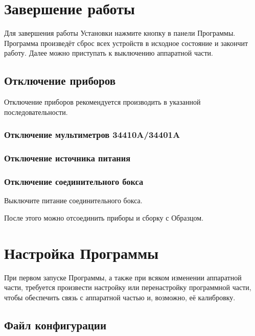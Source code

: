 \documentclass[12pt, a4paper, twocolumn]{report}
\begin{document}
\chapter{Завершение работы}

Для завершения работы Установки нажмите кнопку  в панели Программы. Программа произведёт сброс всех устройств в исходное состояние и закончит работу. Далее можно приступать к выключению аппаратной части.

\section{Отключение приборов}

Отключение приборов рекомендуется производить в указанной последовательности.

\subsection{Отключение мультиметров 34410A/34401A}



\subsection{Отключение источника питания}



\subsection{Отключение соединительного бокса}

Выключите питание соединительного бокса.

\bigskip

После этого можно отсоединить приборы и сборку с Образцом.

\chapter{Настройка Программы}

При первом запуске Программы, а также при всяком изменении аппаратной части, требуется произвести настройку или перенастройку программной части, чтобы обеспечить связь с аппаратной частью и, возможно, её калибровку.

\section{Файл конфигурации}
\end{document}
